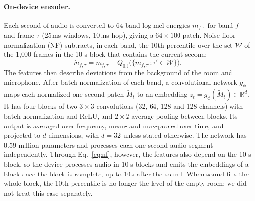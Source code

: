 \documentclass[11pt]{article}
\begin{document}
\paragraph{On-device encoder.} Each second of audio is converted to 64-band log-mel energies $m_{f,\tau}$ for band $f$ and frame $\tau$ (25\,ms windows, 10\,ms hop), giving a $64\times100$ patch. Noise-floor normalization (NF) subtracts, in each band, the 10th percentile over the set $\mathcal{W}$ of the 1,000 frames in the 10-s block that contains the current second:
\begin{equation}
\tilde m_{f,\tau} = m_{f,\tau} - Q_{0.1}\big(\{m_{f,\tau'} : \tau' \in \mathcal{W}\}\big).
\label{eq:nf}
\end{equation}
The features then describe deviations from the background of the room and microphone. After batch normalization of each band, a convolutional network $g_\phi$ maps each normalized one-second patch $\tilde M_t$ to an embedding $z_t = g_\phi(\tilde M_t) \in \mathbb{R}^d$. It has four blocks of two $3\times3$ convolutions (32, 64, 128 and 128 channels) with batch normalization and ReLU, and $2\times2$ average pooling between blocks. Its output is averaged over frequency, mean- and max-pooled over time, and projected to $d$ dimensions, with $d=32$ unless stated otherwise. The network has 0.59 million parameters and processes each one-second audio segment independently. Through Eq.~\eqref{eq:nf}, however, the features also depend on the 10-s block, so the device processes audio in 10-s blocks and emits the embeddings of a block once the block is complete, up to 10\,s after the sound. When sound fills the whole block, the 10th percentile is no longer the level of the empty room; we did not treat this case separately.
\end{document}
